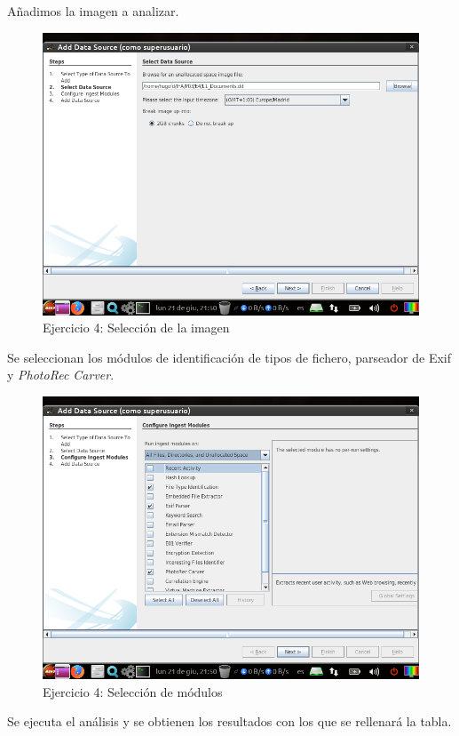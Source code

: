 \documentclass[11pt]{article}
\begin{document}
Añadimos la imagen a analizar.

\begin{figure}[H]
  \caption{Ejercicio 4: Selección de la imagen}
  \centering
  \includegraphics[scale=0.7]{e4-3.png}
\end{figure}

Se seleccionan los módulos de identificación de tipos de fichero, parseador de Exif y \textit{PhotoRec Carver}.

\begin{figure}[H]
  \caption{Ejercicio 4: Selección de módulos}
  \centering
  \includegraphics[scale=0.7]{e4-4.png}
\end{figure}

Se ejecuta el análisis y se obtienen los resultados con los que se rellenará la tabla.
\end{document}
